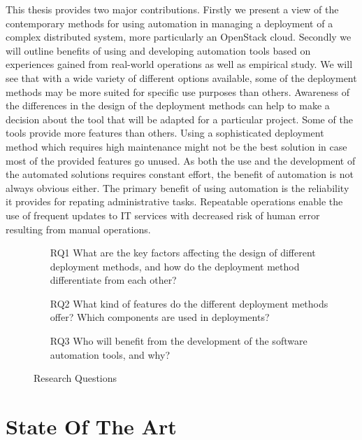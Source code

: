 This thesis provides two major contributions. Firstly we present a view of the
contemporary methods for using automation in managing a deployment of a complex
distributed system, more particularly an OpenStack cloud. Secondly we will
outline benefits of using and developing automation tools based on experiences
gained from real-world operations as well as empirical study. We will see that
with a wide variety of different options available, some of the deployment
methods may be more suited for specific use purposes than others. Awareness of
the differences in the design of the deployment methods can help to make a
decision about the tool that will be adapted for a particular project. Some of
the tools provide more features than others. Using a sophisticated deployment
method which requires high maintenance might not be the best solution in case
most of the provided features go unused. As both the use and the development of
the automated solutions requires constant effort, the benefit of automation is
not always obvious either. The primary benefit of using automation is the
reliability it provides for repating administrative tasks. Repeatable
operations enable the use of frequent updates to IT services with decreased
risk of human error resulting from manual operations.

\begin{figure}[t]
\centering
\begin{itemize}
  \item [RQ1] What are the key factors affecting the design of different
              deployment methods, and how do the deployment method
              differentiate from each other?
  \item [RQ2] What kind of features do the different deployment methods offer?
              Which components are used in deployments?
  \item [RQ3] Who will benefit from the development of the software automation
              tools, and why?
\end{itemize}
\caption{Research Questions}
\label{fig:rqs}
\end{figure}

\chapter{State Of The Art} \label{state-of-the-art}

